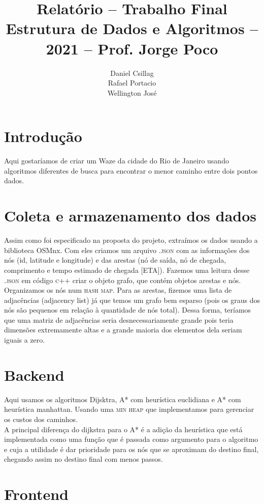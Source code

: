 \documentclass{article}
\title{Relatório -- Trabalho Final \\
       \large Estrutura de Dados e Algoritmos -- 2021 -- Prof. Jorge Poco}
\author{Daniel Csillag \\ Rafael Portacio \\ Wellington José}
\begin{document}
\maketitle

\section{Introdução}
Aqui gostaríamos de criar um Waze da cidade do Rio de Janeiro usando algoritmos diferentes de busca para encontrar o menor caminho entre dois pontos dados. 

\section{Coleta e armazenamento dos dados}

Assim como foi especificado na proposta do projeto, extraímos os dados usando a biblioteca OSMnx. Com eles criamos um arquivo \textsc{.json} com as informações dos nós (id, latitude e longitude) e das arestas (nó de saída, nó de chegada, comprimento e tempo estimado de chegada [ETA]). Fazemos uma leitura desse \textsc{.json} em código \textsc{c++} criar o objeto grafo, que contém objetos arestas e nós. Organizamos os nós num \textsc{hash map}. Para as arestas, fizemos uma lista de adjacências (adjacency list) já que temos um grafo bem esparso (pois os graus dos nós são pequenos em relação à quantidade de nós total). Dessa forma, teríamos que uma matriz de adjacências seria desnecessariamente grande pois teria dimensões extremamente altas e a grande maioria dos elementos dela seriam iguais a zero.

\section{Backend}

Aqui usamos os algoritmos Dijsktra, A* com heurística euclidiana e A* com heurística manhattan. Usando uma \textsc{min heap} que implementamos para gerenciar os custos dos caminhos. \\

A principal diferença do dijkstra para o A* é a adição da heurística que está implementada como uma função que é passada como argumento para o algoritmo e cuja a utilidade é dar prioridade para os nós que se aproximam do destino final, chegando assim no destino final com menos passos.

\section{Frontend}
\end{document}
